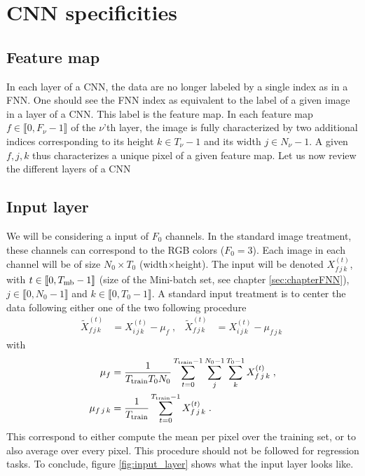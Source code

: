 \section{CNN specificities}



\subsection{Feature map}

In each layer of a CNN, the data are no longer labeled by a single index as in a FNN. One should see the FNN index as equivalent to the label of a given image in a layer of a CNN. This label is the feature map. In each feature map $f\in \llbracket 0,F_\nu-1\rrbracket$ of the $\nu$'th layer, the image is fully characterized by two additional indices corresponding to its height $k\in T_\nu-1$ and its width $j\in N_\nu-1$. A given $f,j,k$ thus characterizes a unique pixel of a given feature map. Let us now review the different layers of a CNN

\subsection{Input layer}


We will be considering a input of $F_0$ channels. In the standard image treatment, these channels can correspond to the RGB colors ($F_0=3$). Each image in each channel will be of size $N_0\times T_0$ (width$\times$height). The input will be denoted $X^{(t)}_{f\,j\,k}$, with $t\in \llbracket 0, T_{{\rm mb}}-1\rrbracket$ (size of the Mini-batch set, see chapter \ref{sec:chapterFNN}), $j \in \llbracket 0, N_0-1\rrbracket$ and $k \in \llbracket 0, T_0-1\rrbracket$. A standard input treatment is to center the data following either one of the two following procedure
\begin{align}
\tilde{X}^{(t)}_{f\,j\,k}&=X^{(t)}_{i\,j\,k}-\mu_{f}\;,&
%
\tilde{X}^{(t)}_{f\,j\,k}&=X^{(t)}_{i\,j\,k}-\mu_{f\,j\,k}\;
\end{align}
with
\begin{align}
\mu_{f}&=\frac{1}{T_{{\rm train}}T_0 N_0}\sum^{T_{{\rm train}}-1}_{t=0}\sum_j^{N_0-1}
%
\sum_k^{T_0-1}X^{(t)}_{f\,j\,k}\;,\\
%
\mu_{f\,j\,k}&=\frac{1}{T_{{\rm train}}}\sum^{T_{{\rm train}}-1}_{t=0}X^{(t)}_{f\,j\,k}\;.
\end{align}
This correspond to either compute the mean per pixel over the training set, or to also average over every pixel. This procedure should not be followed for regression tasks. To conclude, figure \ref{fig:input_layer} shows what the input layer looks like.

